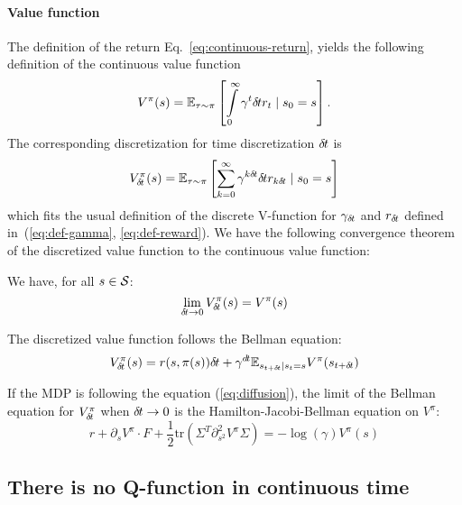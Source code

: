 \paragraph{Value function}

The definition of the return Eq.~\eqref{eq:continuous-return}, yields the
following definition of the continuous value function
\begin{equation}
  V^\pi(s) = \mathbb{E}_{\tau\sim\pi}\left[\int\limits_{0}^\infty \gamma^{t}{\delta\hspace{-.1em}t} r_{t} \mid s_0 = s\right].
\end{equation}
The corresponding discretization for time discretization ${\delta\hspace{-.1em}t}$ is
\begin{equation}
  V^\pi_{\delta\hspace{-.1em}t}(s) = \mathbb{E}_{\tau\sim\pi}\left[\sum\limits_{k=0}^\infty \gamma^{k{\delta\hspace{-.1em}t}}{\delta\hspace{-.1em}t} r_{k{\delta\hspace{-.1em}t}} \mid s_0 = s\right]
\end{equation}
which fits the usual definition of the discrete V-function for $\gamma_{\delta\hspace{-.1em}t}$ and
$r_{\delta\hspace{-.1em}t}$ defined in~(\ref{eq:def-gamma}, \ref{eq:def-reward}).
We have the following convergence theorem of the discretized value function to the continuous value function:
  \begin{theorem}
    We have, for all $s \in {\cal S}$:
    \begin{equation}
      \label{eq:conv-value}
      \lim_{{\delta\hspace{-.1em}t} \rightarrow 0} V^\pi_{\delta\hspace{-.1em}t}(s) = V^\pi(s)
    \end{equation}
  \end{theorem}

The discretized value function follows the Bellman equation:
\begin{equation}
  \label{eq:bellman}
  V^\pi_{\delta\hspace{-.1em}t}(s) = {r}(s, \pi(s)){\delta\hspace{-.1em}t} + \gamma^{d\hspace{-.1em}t} \mathbb{E}_{s_{t+{\delta\hspace{-.1em}t}} | s_t = s} V^\pi(s_{t+{\delta\hspace{-.1em}t}})
\end{equation}

If the MDP is following the equation (\ref{eq:diffusion}), the limit of the Bellman equation for $V^\pi_{\delta\hspace{-.1em}t}$ when ${\delta\hspace{-.1em}t} \rightarrow 0$ is the Hamilton-Jacobi-Bellman equation on $V^\pi$:
\begin{equation}
  \label{eq:hamilton-jacobi-bellman}
  r + \partial_s V^\pi \cdot F + \frac{1}{2} \text{tr}\left(\Sigma^T\partial^2_{s^2} V^\pi\Sigma\right) = - \log(\gamma) V^\pi(s)
\end{equation}


\subsection{There is no Q-function in continuous time}

